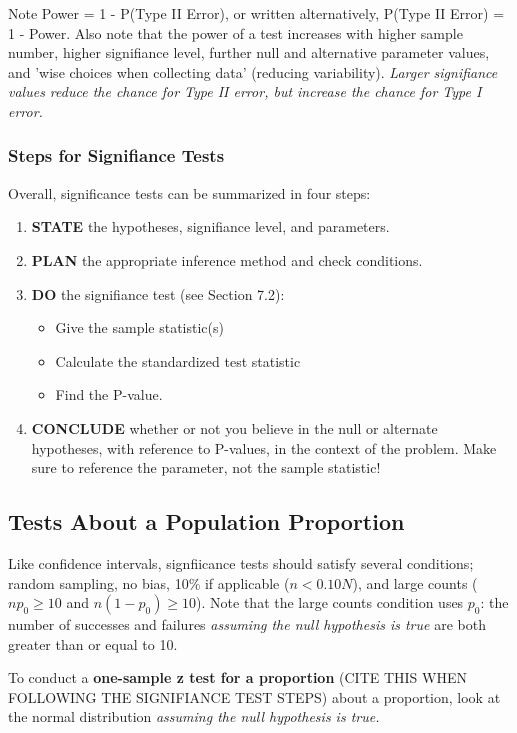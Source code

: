 \documentclass[12pt, a4paper]{article}
\theoremstyle{definition}
\begin{document}
Note Power = 1 - P(Type II Error), or written alternatively, P(Type II Error) = 1 - Power. Also note that the power of a test increases with higher sample number, higher signifiance level, further null and alternative parameter values, and 'wise choices when collecting data' (reducing variability).
\textit{Larger signifiance values reduce the chance for Type II error, but increase the chance for Type I error.}

\subsubsection{Steps for Signifiance Tests}
Overall, significance tests can be summarized in four steps:
\begin{enumerate}
    \item \textbf{STATE} the hypotheses, signifiance level, and parameters.
    \item \textbf{PLAN} the appropriate inference method and check conditions.
    \item \textbf{DO} the signifiance test (see Section 7.2): \begin{itemize}
        \item Give the sample statistic(s)
        \item Calculate the standardized test statistic
        \item Find the P-value.
    \end{itemize}
    \item \textbf{CONCLUDE} whether or not you believe in the null or alternate hypotheses, with reference to P-values, in the context of the problem. Make sure to reference the parameter, not the sample statistic!
\end{enumerate}

\subsection{Tests About a Population Proportion}

Like confidence intervals, signfiicance tests should satisfy several conditions; random sampling, no bias, 10\% if applicable ($n < 0.10N$), and large counts ($np_0 \geq 10$ and $n(1-p_0) \geq 10$).
Note that the large counts condition uses $p_0$: the number of successes and failures \textit{assuming the null hypothesis is true} are both greater than or equal to 10.

To conduct a \textbf{one-sample z test for a proportion} (CITE THIS WHEN FOLLOWING THE SIGNIFIANCE TEST STEPS) about a proportion, look at the normal distribution \textit{assuming the null hypothesis is true.}
\end{document}
